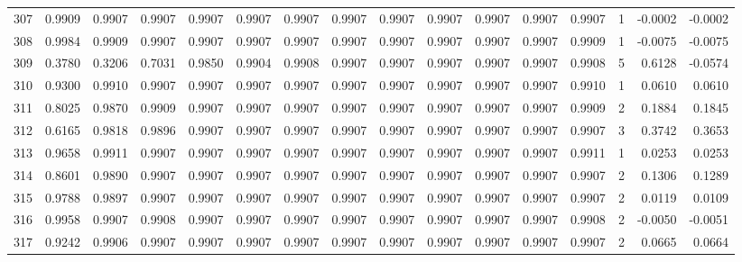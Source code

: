 \begin{tabular}{lrrrrrrrrrrrrrrr}
307 &      0.9909 &  0.9907 &  0.9907 &  0.9907 &  0.9907 &  0.9907 &  0.9907 &  0.9907 &  0.9907 &  0.9907 &   0.9907 &     0.9907 &      1 &                   -0.0002 &                    -0.0002 \\
308 &      0.9984 &  0.9909 &  0.9907 &  0.9907 &  0.9907 &  0.9907 &  0.9907 &  0.9907 &  0.9907 &  0.9907 &   0.9907 &     0.9909 &      1 &                   -0.0075 &                    -0.0075 \\
309 &      0.3780 &  0.3206 &  0.7031 &  0.9850 &  0.9904 &  0.9908 &  0.9907 &  0.9907 &  0.9907 &  0.9907 &   0.9907 &     0.9908 &      5 &                    0.6128 &                    -0.0574 \\
310 &      0.9300 &  0.9910 &  0.9907 &  0.9907 &  0.9907 &  0.9907 &  0.9907 &  0.9907 &  0.9907 &  0.9907 &   0.9907 &     0.9910 &      1 &                    0.0610 &                     0.0610 \\
311 &      0.8025 &  0.9870 &  0.9909 &  0.9907 &  0.9907 &  0.9907 &  0.9907 &  0.9907 &  0.9907 &  0.9907 &   0.9907 &     0.9909 &      2 &                    0.1884 &                     0.1845 \\
312 &      0.6165 &  0.9818 &  0.9896 &  0.9907 &  0.9907 &  0.9907 &  0.9907 &  0.9907 &  0.9907 &  0.9907 &   0.9907 &     0.9907 &      3 &                    0.3742 &                     0.3653 \\
313 &      0.9658 &  0.9911 &  0.9907 &  0.9907 &  0.9907 &  0.9907 &  0.9907 &  0.9907 &  0.9907 &  0.9907 &   0.9907 &     0.9911 &      1 &                    0.0253 &                     0.0253 \\
314 &      0.8601 &  0.9890 &  0.9907 &  0.9907 &  0.9907 &  0.9907 &  0.9907 &  0.9907 &  0.9907 &  0.9907 &   0.9907 &     0.9907 &      2 &                    0.1306 &                     0.1289 \\
315 &      0.9788 &  0.9897 &  0.9907 &  0.9907 &  0.9907 &  0.9907 &  0.9907 &  0.9907 &  0.9907 &  0.9907 &   0.9907 &     0.9907 &      2 &                    0.0119 &                     0.0109 \\
316 &      0.9958 &  0.9907 &  0.9908 &  0.9907 &  0.9907 &  0.9907 &  0.9907 &  0.9907 &  0.9907 &  0.9907 &   0.9907 &     0.9908 &      2 &                   -0.0050 &                    -0.0051 \\
317 &      0.9242 &  0.9906 &  0.9907 &  0.9907 &  0.9907 &  0.9907 &  0.9907 &  0.9907 &  0.9907 &  0.9907 &   0.9907 &     0.9907 &      2 &                    0.0665 &                     0.0664 \\

\end{tabular}
